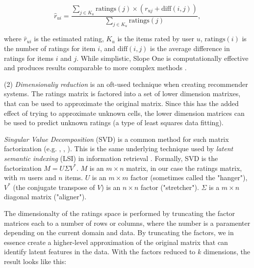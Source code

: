 \begin{equation*}
  \hat{r}_{ui} = \frac{\sum_{j \in K_u} \mathrm{ratings}(j) \times (r_{uj} + \mathrm{diff}(i,j))}{\sum_{j \in K_u} \mathrm{ratings}(j) },
\end{equation*}

where $\hat{r}_{ui}$ is the estimated rating, $K_u$ is the items rated by user $u$, $\mathrm{ratings}(i)$ is the number of ratings for item $i$,
and $\mathrm{diff}(i,j)$ is the average difference in ratings for items $i$ and $j$.
While simplistic, Slope One is computationally effective and produces results comparable to more complex methods \cite[p5]{Lemire2005}.

(2) \emph{Dimensionaliy reduction} is an oft-used technique when creating recommender systems.
The ratings matrix is factored into a set of lower dimension matrixes, that can be used to approximate the original matrix.
Since this has the added effect of trying to approximate unknown cells, the lower dimension matrices
can be used to predict unknown ratings (a type of least squares data fitting).

\emph{Singular Value Decomposition} (SVD) is a common method for such matrix factorization (e.g. \citet[p5]{Billsus}, \citet{Sun2005}, \citet{Bell2007}).  
This is the same underlying technique used by \emph{latent semantic indexing} (LSI) in information retrieval \cite[p44]{Baeza-Yates1999}.
Formally, SVD is the factorization $M = U \Sigma V^{*}$. 
$M$ is an $m \times n$ matrix, in our case the ratings matrix, with $m$ users and $n$ items. 
$U$ is an $m \times m$ factor (sometimes called the "hanger"), $V^{*}$ (the conjugate transpose of $V$) is an $n \times n$ factor ("stretcher").
$\Sigma$ is a $m \times n$ diagonal matrix ("aligner"). 

The dimensionalty of the ratings space is performed by truncating the factor matrices each to a number of rows or columns, 
where the number is a paramenter depending on the current domain and data. By truncating the factors, 
we in essence create a higher-level approximation of the original matrix that can identify latent features in the data.
With the factors reduced to $k$ dimensions, the result looks like this:

